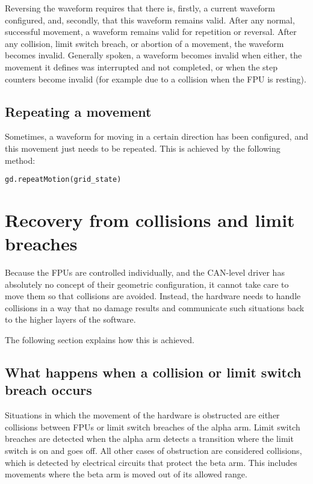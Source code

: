 \documentclass{scrartcl}[12pt,a4paper]
\begin{document}
Reversing the waveform requires that there is, firstly, a current
waveform configured, and, secondly, that this waveform remains valid.
After any normal, successful movement, a waveform remains valid for
repetition or reversal. After any collision, limit switch breach, or
abortion of a movement, the waveform becomes invalid. Generally
spoken, a waveform becomes invalid when either, the movement it
defines was interrupted and not completed, or when the step counters
become invalid (for example due to a collision when the FPU is
resting).


\subsection{Repeating a movement}

Sometimes, a waveform for moving in a certain direction has been
configured, and this movement just needs to be repeated.  This is
achieved by the following method:

\begin{verbatim}
gd.repeatMotion(grid_state)
\end{verbatim}


\section{Recovery from collisions and limit breaches}
\label{sec:recovery}

Because the FPUs are controlled individually, and the CAN-level driver
has absolutely no concept of their geometric configuration, it cannot
take care to move them so that collisions are avoided.  Instead, the
hardware needs to handle collisions in a way that no damage results
and communicate such situations back to the higher layers of the
software.

The following section explains how this is achieved.

\subsection{What happens when a collision or limit switch breach occurs}

Situations in which the movement of the hardware is obstructed are
either collisions between FPUs or limit switch breaches of the alpha
arm. Limit switch breaches are detected when the alpha arm detects a
transition where the limit switch is on and goes off. All other cases
of obstruction are considered collisions, which is detected by
electrical circuits that protect the beta arm. This includes movements
where the beta arm is moved out of its allowed range.
\end{document}
